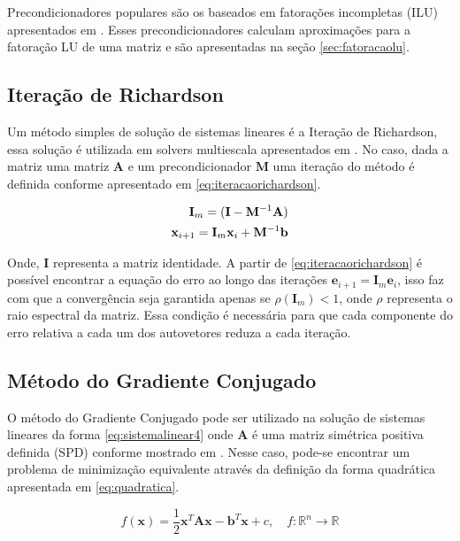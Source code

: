 Precondicionadores populares são os baseados em fatorações incompletas (ILU) apresentados em \citet{ilupaper}. Esses precondicionadores calculam aproximações para a fatoração LU de uma matriz e são apresentadas na seção \ref{sec:fatoracaolu}.

\subsection{Iteração de Richardson}

Um método simples de solução de sistemas lineares é a Iteração de Richardson, essa solução é utilizada em solvers multiescala apresentados em \citet{msparalelo}. No caso, dada a matriz uma matriz $\mathbf{A}$ e um precondicionador $\mathbf{M}$ uma iteração do método é definida conforme apresentado em \eqref{eq:iteracaorichardson}.

\begin{align} \label{eq:iteracaorichardson}
\mathbf{I}_m = (\mathbf{I} - \mathbf{M}^{-1} \mathbf{A})    \\
\mathbf{x}_{i+1} = \mathbf{I}_m  \mathbf{x}_i + \mathbf{M}^{-1} \mathbf{b}  
\end{align}

Onde, $\mathbf{I}$ representa a matriz identidade. A partir de \eqref{eq:iteracaorichardson} é possível encontrar a equação do erro ao longo das iterações $\mathbf{e}_{i+1} = \mathbf{I}_m \mathbf{e}_i$, isso faz com que a convergência seja garantida apenas se $\rho(\mathbf{I}_m) < 1$, onde $\rho$ representa o raio espectral da matriz. Essa condição é necessária para que cada componente do erro relativa a cada  um dos autovetores reduza a cada iteração.


\subsection{Método do Gradiente Conjugado}

O método do Gradiente Conjugado pode ser utilizado na solução de sistemas lineares da forma \eqref{eq:sistemalinear4} onde $\mathbf{A}$ é uma matriz simétrica positiva definida (SPD) conforme mostrado em \citet{Shewchuk94anintroduction}. Nesse caso, pode-se encontrar um problema de minimização equivalente através da definição da forma quadrática apresentada em \eqref{eq:quadratica}. 

\begin{equation} \label{eq:quadratica}
    f(\mathbf{x}) = \frac{1}{2}  \mathbf{x}^T \mathbf{A} \mathbf{x} - \mathbf{b}^T \mathbf{x} + c, \quad f:\mathbb{R}^n \rightarrow \mathbb{R}
\end{equation}

